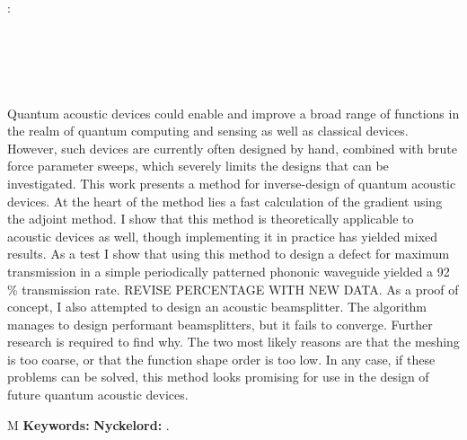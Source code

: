\thesisImprintTitle:\\
\thesisImprintSubtitle\\[1ex]
\thesisAuthor\\
\thesisDepartment\\
\thesisUniversity

\thispagestyle{plain}           %
\section*{\abstractname}
Quantum acoustic devices could enable and improve a broad range of functions in
the realm of quantum computing and sensing as well as classical devices.
However, such devices are currently often designed by hand, combined with brute force
parameter sweeps, which severely limits the designs that can be investigated.
This work presents a method for inverse-design of quantum acoustic devices.
At the heart of the method lies a fast calculation of the gradient using the
adjoint method.
I show that this method is theoretically applicable to acoustic devices as well,
though implementing it in practice has yielded mixed results.
As a test I show that using this method to design a defect for maximum transmission
in a simple periodically patterned phononic waveguide yielded a 92 \% transmission rate.
REVISE PERCENTAGE WITH NEW DATA.
As a proof of concept, I also attempted to design an acoustic beamsplitter.
The algorithm manages to design performant beamsplitters, but it fails to converge.
Further research is required to find why.
The two most likely reasons are that the meshing is too coarse,
or that the function shape order is too low.
In any case, if these problems can be solved,
this method looks promising for use in the design of future quantum acoustic devices.

\if\thesisType M
    \textbf{Keywords:}
\else
    \textbf{Nyckelord:}
\fi
\thesisKeywords.

\if{}
\newpage                %
\thispagestyle{empty}
\mbox{}
\fi
